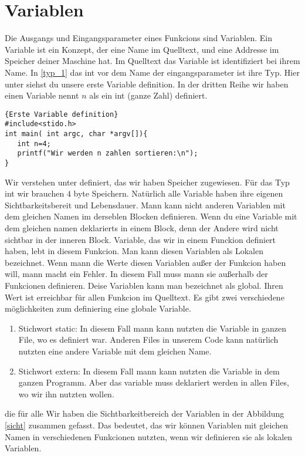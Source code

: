 \section{Variablen}
Die Ausgangs und Eingangsparameter eines Funkcions sind Variablen.
Ein Variable ist ein Konzept, der eine Name im Quelltext, und eine Addresse im Speicher deiner Maschine hat. 
Im Quelltext das Variable ist identifiziert bei ihrem Name. In \ref{typ_1} das int vor dem Name der eingangsparameter
ist ihre Typ. Hier unter siehst du unsere erste Variable definition. In der dritten Reihe wir haben einen Variable
nennt $n$ als ein int (ganze Zahl) definiert. 
\begin{lstlisting}{Erste Variable definition}
#include<stido.h>
int main( int argc, char *argv[]){
   int n=4;
   printf("Wir werden n zahlen sortieren:\n");
}
\end{lstlisting}

Wir verstehen unter definiert, das wir haben Speicher zugewiesen. Für das Typ int wir brauchen $4$ byte Speichern.
Natürlich alle Variable haben ihre eigenen Sichtbarkeitsbereit und Lebensdauer. Mann kann nicht anderen Variablen mit dem gleichen Namen 
im derseblen Blocken definieren. Wenn du eine Variable mit dem gleichen namen deklarierts in einem Block, denn der Andere wird nicht
sichtbar in der inneren Block. Variable, das wir in einem Funckion definiert haben, lebt in diesem Funkcion. Man kann diesen Variablen als 
Lokalen bezeichnet. Wenn mann die Werte diesen Variablen außer der Funkcion haben will, mann macht ein Fehler. In diesem Fall 
muss mann sie außerhalb der Funkcionen definieren. Deise Variablen kann man bezeichnet als global. 
Ihren Wert ist erreichbar für allen Funkcion im Quelltext. Es gibt zwei verschiedene möglichkeiten zum definiering
eine globale Variable.
\begin{enumerate}
\item Stichwort static: In diesem Fall mann kann nutzten die Variable in ganzen File, wo es definiert war. Anderen
Files in unserem Code kann natürlich nutzten eine andere Variable mit dem gleichen Name.
\item Stichwort extern: In diesem Fall mann kann nutzten die Variable in dem ganzen Programm. Aber das
variable muss deklariert werden in allen Files, wo wir ihn nutzten wollen.
\end{enumerate} die für alle
Wir haben die Sichtbarkeitbereich der Variablen 
in der Abbildung  \ref{sicht} zusammen gefasst.  Das bedeutet, das wir können Variablen mit 
gleichen Namen in verschiedenen Funkcionen nutzten, wenn wir definieren sie als lokalen Variablen. 

